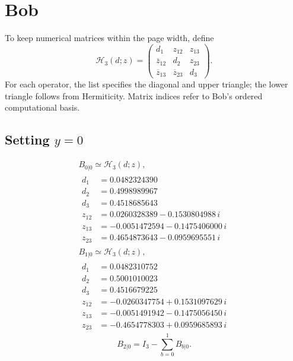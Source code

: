 \documentclass[11pt]{article}
\begin{document}
\section{Bob}
To keep numerical matrices within the page width, define
\[
\mathcal H_3(d;z)=
\begin{pmatrix}
d_1&z_{12}&z_{13}\\
\overline{z}_{12}&d_2&z_{23}\\
\overline{z}_{13}&\overline{z}_{23}&d_3
\end{pmatrix}.
\]
For each operator, the list specifies the diagonal and upper triangle;
the lower triangle follows from Hermiticity. Matrix indices refer to
Bob's ordered computational basis.
\subsection*{Setting $y=0$}
\[
\begin{gathered}
B_{0|0}\simeq\mathcal H_3(d;z),\\[3pt]
\begin{aligned}
d_1&=0.0482324390 \\
d_2&=0.4998989967 \\
d_3&=0.4518685643 \\
z_{12}&=0.0260328389-0.1530804988\,i \\
z_{13}&=-0.0051472594-0.1475406000\,i \\
z_{23}&=0.4654873643-0.0959695551\,i
\end{aligned}
\end{gathered}
\]
\[
\begin{gathered}
B_{1|0}\simeq\mathcal H_3(d;z),\\[3pt]
\begin{aligned}
d_1&=0.0482310752 \\
d_2&=0.5001010023 \\
d_3&=0.4516679225 \\
z_{12}&=-0.0260347754+0.1531097629\,i \\
z_{13}&=-0.0051491942-0.1475056450\,i \\
z_{23}&=-0.4654778303+0.0959685893\,i
\end{aligned}
\end{gathered}
\]
\[
B_{2|0}=I_3-\sum_{b=0}^1B_{b|0}.
\]
\end{document}
